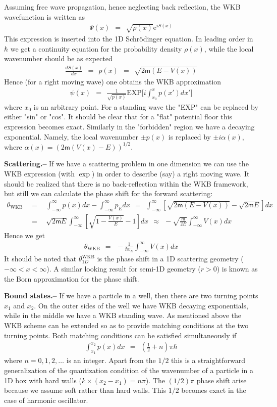 \documentclass[onecolumn,fleqn]{revtex4}
\newcommand{\eexp}{\mathrm{e}^}
\newcommand{\mass}{\mathsf{m}}
\newcommand{\tbox}[1]{\text{#1}}
\newcommand{\beq}{\begin{eqnarray}}
\newcommand{\eeq}{\end{eqnarray}}
\begin{document}
Assuming free wave propagation, hence neglecting 
back reflection, the WKB wavefunction is written as 
\beq 
\Psi(x) \ \  = \ \ \sqrt{\rho(x)} \eexp{iS(x)} 
\eeq
This expression is inserted into the 1D Schr\"{o}dinger 
equation. In leading order in $\hbar$ we get 
a continuity equation for the probability density $\rho(x)$, 
while the local wavenumber should be as expected 
\beq 
\frac{dS(x)}{dx} \ \ = \ \ p(x) \ \ = \ \ \sqrt{2\mass (E-V(x))} 
\eeq
Hence (for a right moving wave) one obtains the WKB approximation
\beq 
\psi(x) \ \ = \ \ \frac{1}{\sqrt{p(x)}}\mbox{EXP}\Big[i\int_{x_0}^{x}p(x')dx'\Big] 
\eeq
where $x_0$ is an arbitrary point. 
For a standing wave the "EXP" can be replaced 
by either "sin" or "cos". 
It should be clear that for a "flat" potential 
floor this expression becomes exact.
Similarly in the "forbidden" region
we have a decaying exponential. Namely,  
the local wavenumber $\pm p(x)$ is replaced 
by ${\pm i\alpha(x)}$, 
where  $\alpha(x) = (2 \mass (V(x)-E))^{1/2}$. 

 

{\bf Scattering.-- } 
If we have a scattering problem in one dimension 
we can use the WKB expression (with $\exp$) in order 
to describe (say) a right moving wave. 
It should be realized that there is no back-reflection 
within the WKB framework, but still we can calculate 
the phase shift for the forward scattering: 
\beq 
\theta_{\tbox{WKB}} & \ \ = \ \ & 
\int_{-\infty}^{\infty}p(x)dx -\int_{-\infty}^{\infty} p_E dx 
\ \ = \ \ 
\int_{-\infty}^{\infty}\left[\sqrt{2\mass(E-V(x))}-\sqrt{2\mass E}\right]dx 
\\ \nonumber
& \ \ = \ \ &
\sqrt{2\mass E}\int_{-\infty}^{\infty} \left[\sqrt{1-\frac{V(x)}{E}}-1\right]dx        
\ \ \approx \ \ 
-\sqrt{\frac{\mass}{2E}}\int_{-\infty}^{\infty}V(x)dx  
\eeq
Hence we get 
\beq 
\theta_{\tbox{WKB}} \ \ = \ \ -\frac{1}{\hbar v_E}\int_{-\infty}^{\infty}V(x)dx 
\eeq
It should be noted that $\theta^{\tbox{WKB}}_{1D}$ 
is the phase shift in a 1D scattering geometry ($-\infty<x<\infty$). 
A similar looking result for semi-1D geometry ($r>0$) 
is known as the Born approximation for the phase shift.



{\bf Bound states.-- } 
If we have a particle in a well, 
then there are two turning points $x_1$ and $x_2$. 
On the outer sides of the well we have WKB decaying 
exponentials, while in the middle we have 
a WKB standing wave. 
As mentioned above the WKB scheme can be extended 
so as to provide matching conditions at the 
two turning points. Both matching conditions 
can be satisfied simultaneously if 
\beq
\int_{x_1}^{x_2} p(x)dx \ \ = \ \  \left(\frac{1}{2}+n\right)\pi\hbar
\eeq
where $n=0,1,2, \dots $ is an integer.
Apart from the $1/2$ this is a straightforward 
generalization of the quantization condition
of the wavenumber of a particle in a 1D box with hard walls 
(${k\times(x_2-x_1)=n\pi}$). 
The $(1/2)\pi$ phase shift arise because 
we assume soft rather than hard walls. 
This $1/2$ becomes exact in the case 
of harmonic oscillator. 
\end{document}
